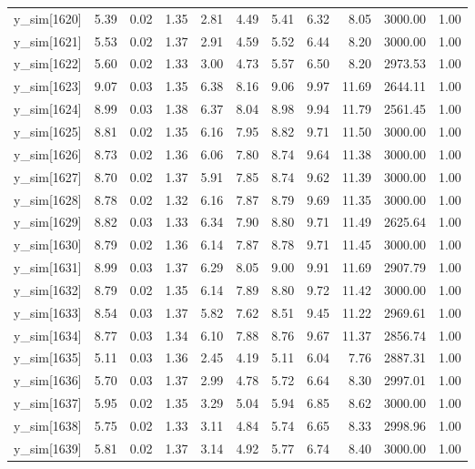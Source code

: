 \begin{table}[ht]
\begin{tabular}{rrrrrrrrrrr}
  y\_sim[1620] & 5.39 & 0.02 & 1.35 & 2.81 & 4.49 & 5.41 & 6.32 & 8.05 & 3000.00 & 1.00 \\ 
  y\_sim[1621] & 5.53 & 0.02 & 1.37 & 2.91 & 4.59 & 5.52 & 6.44 & 8.20 & 3000.00 & 1.00 \\ 
  y\_sim[1622] & 5.60 & 0.02 & 1.33 & 3.00 & 4.73 & 5.57 & 6.50 & 8.20 & 2973.53 & 1.00 \\ 
  y\_sim[1623] & 9.07 & 0.03 & 1.35 & 6.38 & 8.16 & 9.06 & 9.97 & 11.69 & 2644.11 & 1.00 \\ 
  y\_sim[1624] & 8.99 & 0.03 & 1.38 & 6.37 & 8.04 & 8.98 & 9.94 & 11.79 & 2561.45 & 1.00 \\ 
  y\_sim[1625] & 8.81 & 0.02 & 1.35 & 6.16 & 7.95 & 8.82 & 9.71 & 11.50 & 3000.00 & 1.00 \\ 
  y\_sim[1626] & 8.73 & 0.02 & 1.36 & 6.06 & 7.80 & 8.74 & 9.64 & 11.38 & 3000.00 & 1.00 \\ 
  y\_sim[1627] & 8.70 & 0.02 & 1.37 & 5.91 & 7.85 & 8.74 & 9.62 & 11.39 & 3000.00 & 1.00 \\ 
  y\_sim[1628] & 8.78 & 0.02 & 1.32 & 6.16 & 7.87 & 8.79 & 9.69 & 11.35 & 3000.00 & 1.00 \\ 
  y\_sim[1629] & 8.82 & 0.03 & 1.33 & 6.34 & 7.90 & 8.80 & 9.71 & 11.49 & 2625.64 & 1.00 \\ 
  y\_sim[1630] & 8.79 & 0.02 & 1.36 & 6.14 & 7.87 & 8.78 & 9.71 & 11.45 & 3000.00 & 1.00 \\ 
  y\_sim[1631] & 8.99 & 0.03 & 1.37 & 6.29 & 8.05 & 9.00 & 9.91 & 11.69 & 2907.79 & 1.00 \\ 
  y\_sim[1632] & 8.79 & 0.02 & 1.35 & 6.14 & 7.89 & 8.80 & 9.72 & 11.42 & 3000.00 & 1.00 \\ 
  y\_sim[1633] & 8.54 & 0.03 & 1.37 & 5.82 & 7.62 & 8.51 & 9.45 & 11.22 & 2969.61 & 1.00 \\ 
  y\_sim[1634] & 8.77 & 0.03 & 1.34 & 6.10 & 7.88 & 8.76 & 9.67 & 11.37 & 2856.74 & 1.00 \\ 
  y\_sim[1635] & 5.11 & 0.03 & 1.36 & 2.45 & 4.19 & 5.11 & 6.04 & 7.76 & 2887.31 & 1.00 \\ 
  y\_sim[1636] & 5.70 & 0.03 & 1.37 & 2.99 & 4.78 & 5.72 & 6.64 & 8.30 & 2997.01 & 1.00 \\ 
  y\_sim[1637] & 5.95 & 0.02 & 1.35 & 3.29 & 5.04 & 5.94 & 6.85 & 8.62 & 3000.00 & 1.00 \\ 
  y\_sim[1638] & 5.75 & 0.02 & 1.33 & 3.11 & 4.84 & 5.74 & 6.65 & 8.33 & 2998.96 & 1.00 \\ 
  y\_sim[1639] & 5.81 & 0.02 & 1.37 & 3.14 & 4.92 & 5.77 & 6.74 & 8.40 & 3000.00 & 1.00 \\ 

\end{tabular}
\end{table}
